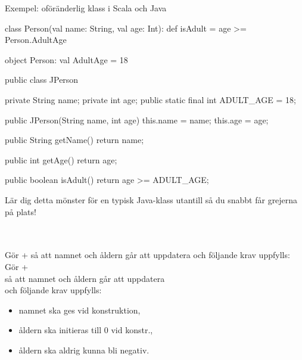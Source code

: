 \begin{Slide}{Exempel: oföränderlig klass i Scala och Java}
\ifkompendium
\noindent{}
\else
\SlideFontTiny\vspace{-1em}\begin{multicols}{2}
\fi
\begin{CodeSmall}[basicstyle=\ttfamily\SlideFontSize{5.7}{6.7}]
class Person(val name: String, val age: Int):
  def isAdult = age >= Person.AdultAge

object Person:
  val AdultAge = 18
\end{CodeSmall}

\ifkompendium
\noindent{}
\else
\columnbreak
\fi

\pause
\begin{CodeSmall}[language=Java,basicstyle=\ttfamily\SlideFontSize{5.7}{6.7}]
public class JPerson {
    private String name;
    private int age;
    public static final int ADULT_AGE = 18;

    public JPerson(String name, int age) {
      this.name = name;
      this.age = age;
    }

    public String getName() {
        return name;
    }

    public int getAge() {
        return age;
    }

    public boolean isAdult() {
        return age >= ADULT_AGE;
    }
}
\end{CodeSmall}
Lär dig detta mönster för en typisk Java-klass utantill så du snabbt får grejerna på plats!
\ifkompendium\\\else
\end{multicols}
\pause\vspace{-13em}%
\fi%
~\\\\
\ifkompendium
Gör  +   så att namnet och åldern går att uppdatera och följande krav uppfylls:
\else
Gör  +  \\så att namnet och åldern går att uppdatera\\och följande krav uppfylls:
\fi
\begin{itemize}
\item namnet ska ges vid konstruktion,
\item åldern ska initieras till 0 vid konstr.,
\item åldern ska aldrig kunna bli negativ.
\end{itemize}
\end{Slide}


